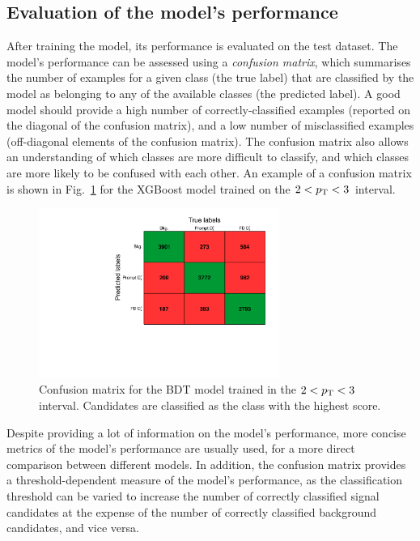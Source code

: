 \subsection{Evaluation of the model's performance}\label{sec:ml_performance}
After training the model, its performance is evaluated on the test dataset. The model's performance can be assessed using a \emph{confusion matrix}, which summarises the number of examples for a given class (the true label) that are classified by the model as belonging to any of the available classes (the predicted label). A good model should provide a high number of correctly-classified examples (reported on the diagonal of the confusion matrix), and a low number of misclassified examples (off-diagonal elements of the confusion matrix). The confusion matrix also allows an understanding of which classes are more difficult to classify, and which classes are more likely to be confused with each other. An example of a confusion matrix is shown in Fig.~\ref{fig:ml_confusion_matrix} for the XGBoost model trained on the $2<p_\mathrm{T}<3$~\gevc interval.

\begin{figure}
    \centering
    \includegraphics[width=0.7\textwidth]{Figures/Chapter 5/ConfusionMatrix.pdf}
    \caption{Confusion matrix for the BDT model trained in the \mbox{$2<p_\mathrm{T}<3$~\gevc} interval. Candidates are classified as the class with the highest score.}
    \label{fig:ml_confusion_matrix}
\end{figure}

Despite providing a lot of information on the model's performance, more concise metrics of the model's performance are usually used, for a more direct comparison between different models. In addition, the confusion matrix provides a threshold-dependent measure of the model's performance, as the classification threshold can be varied to increase the number of correctly classified signal candidates at the expense of the number of correctly classified background candidates, and vice versa. 

